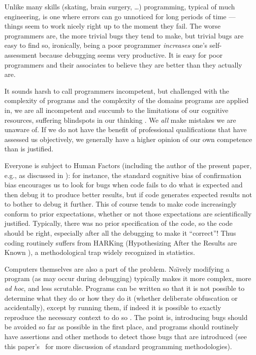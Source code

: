 Unlike many skills (skating, brain surgery, \ldots) programming, typical of much engineering, is one where errors can go unnoticed for long periods of time --- things seem to work nicely right up to the moment they fail. The worse programmers are, the more trivial bugs they tend to make, but trivial bugs are easy to find so, ironically, being a poor programmer \emph{increases\/} one's self-assessment because debugging seems very productive. It is easy for poor programmers and their associates to believe they are better than they actually are. 

It sounds harsh to call programmers incompetent, but challenged with the complexity of programs and the complexity of the domains programs are applied in, we are all incompetent and succumb to the limitations of our cognitive resources, suffering blindspots in our thinking \cite{fixit}. We \emph{all\/} make mistakes we are unaware of. If we do not have the benefit of professional qualifications that have assessed us objectively, we generally have a higher opinion of our own competence than is justified.

{Everyone is subject to Human Factors (including the author of the present paper, e.g., as discussed in \cite{enigma}): for instance, the standard cognitive bias of confirmation bias encourages us to look for bugs when code fails to do what is expected and then debug it to produce better results, but if code generates expected results not to bother to debug it further. This of course tends to make code increasingly conform to prior expectations, whether or not those expectations are scientifically justified. Typically, there was no prior specification of the code, so the code should be right, especially after all the debugging to make it ``correct''! Thus coding routinely suffers from HARKing (Hypothesizing After the Results are Known \cite{harking}), a methodological trap widely recognized in statistics.}

Computers themselves are also a part of the problem. Na\"\i vely modifying a program (as may occur during debugging) typically makes it more complex, more \emph{ad hoc}, and less scrutable. Programs can be written so that it is not possible to determine what they do or how they do it (whether deliberate obfuscation or accidentally), except by running them, if indeed it is possible to exactly reproduce the necessary context to do so \cite{framework}. The point is, introducing bugs should be avoided so far as possible in the first place, and programs should routinely have assertions and other methods to detect those bugs that are introduced (see this paper's \supplement\ for more discussion of standard programming methodologies).
\fi

